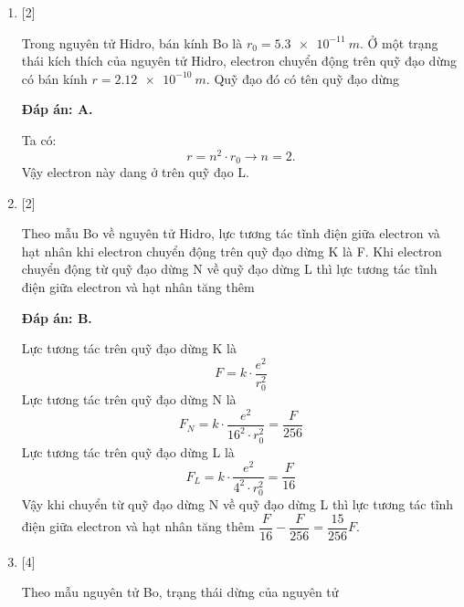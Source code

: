 \begin{enumerate}[label=\bfseries Câu \arabic*:]
	\item {} [2]
		\cauhoi
	{Trong nguyên tử Hidro, bán kính Bo là $ r_{0} = \SI{5,3e-11}{m} $. Ở một trạng thái kích thích của nguyên tử Hidro, electron chuyển động trên quỹ đạo dừng có bán kính $ r = \SI{2,12e-10}{m} $. Quỹ đạo đó có tên quỹ đạo dừng
	}
	
	
	\loigiai
	{		\textbf{Đáp án: A.}
		
		Ta có:
		$$
		r = n^{2} \cdot r_{0} \rightarrow n = \num{2}.
		$$
		Vậy electron này dang ở trên quỹ đạo L.		
	}
	
	\item {} [2]
	\cauhoi
	{Theo mẫu Bo về nguyên tử Hidro, lực tương tác tĩnh điện giữa electron và hạt nhân khi electron chuyển động trên quỹ đạo dừng K là F. Khi electron chuyển động từ quỹ đạo dừng N về quỹ đạo dừng L thì lực tương tác tĩnh điện giữa electron và hạt nhân tăng thêm
	}
	
	\loigiai
	{		\textbf{Đáp án: B.}
		
		Lực tương tác trên quỹ đạo dừng K là
		$$
		F = k \cdot \dfrac{e^{2}}{r_{0}^2}
		$$ 
		Lực tương tác trên quỹ đạo dừng N là
		$$
		F_{N} = k \cdot \dfrac{e^{2}}{16^{2} \cdot r_{0}^2} = \dfrac{F}{256}
		$$   
		Lực tương tác trên quỹ đạo dừng L là
		$$
		F_{L} = k \cdot \dfrac{e^{2}}{4^{2} \cdot r_{0}^2} = \dfrac{F}{16}
		$$           		
		Vậy khi chuyển từ quỹ đạo dừng N về quỹ đạo dừng L thì lực tương tác tĩnh điện giữa electron và hạt nhân tăng thêm $ \dfrac{F}{16} - \dfrac{F}{256} = \dfrac{15}{256} F$.
	}
	
	\item {} [4]
	\cauhoi
	{Theo mẫu nguyên tử Bo, trạng thái dừng của nguyên tử
	}
	

\end{enumerate}
